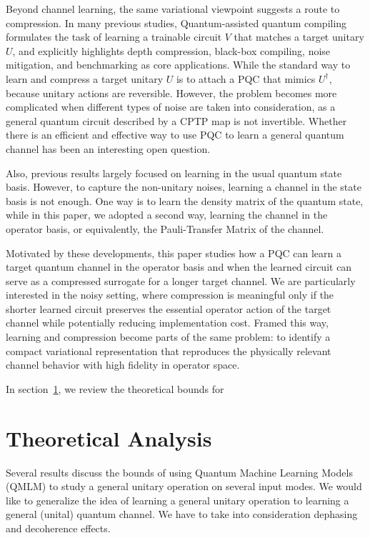 \documentclass[%
 reprint,
superscriptaddress,
 amsmath,amssymb,
 aps,
]{revtex4-2}
\begin{document}
Beyond channel learning, the same variational viewpoint suggests a route to compression. In many previous studies, Quantum-assisted quantum compiling formulates the task of learning a trainable circuit $V$ that matches a target unitary $U$, and explicitly highlights depth compression, black-box compiling, noise mitigation, and benchmarking as core applications. While the standard way to learn and compress a target unitary $U$ is to attach a PQC that mimics $U^{\dagger}$, because unitary actions are reversible. However, the problem becomes more complicated when different types of noise are taken into consideration, as a general quantum circuit described by a CPTP map is not invertible. Whether there is an efficient and effective way to use PQC to learn a general quantum channel has been an interesting open question.

Also, previous results largely focused on learning in the usual quantum state basis. However, to capture the non-unitary noises, learning a channel in the state basis is not enough. One way is to learn the density matrix of the quantum state, while in this paper, we adopted a second way, learning the channel in the operator basis, or equivalently, the Pauli-Transfer Matrix of the channel.

Motivated by these developments, this paper studies how a PQC can learn a target quantum channel in the operator basis and when the learned circuit can serve as a compressed surrogate for a longer target channel. We are particularly interested in the noisy setting, where compression is meaningful only if the shorter learned circuit preserves the essential operator action of the target channel while potentially reducing implementation cost. Framed this way, learning and compression become parts of the same problem: to identify a compact variational representation that reproduces the physically relevant channel behavior with high fidelity in operator space.

In section~\ref{sec:theoretical_analysis}, we review the theoretical bounds for 


\section{Theoretical Analysis}
\label{sec:theoretical_analysis}
Several results discuss the bounds of using Quantum Machine Learning Models (QMLM) to study a general unitary operation on several input modes. We would like to generalize the idea of learning a general unitary operation to learning a general (unital) quantum channel. We have to take into consideration dephasing and decoherence effects.
\end{document}
